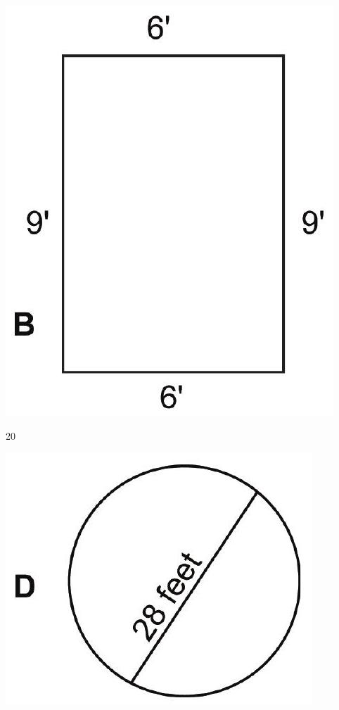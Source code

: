 \documentclass[10pt]{article}
\begin{document}
\includegraphics[max width=\textwidth]{2022_09_11_72dbedc910e6e984560cg-28(1)}

20

\includegraphics[max width=\textwidth]{2022_09_11_72dbedc910e6e984560cg-28(2)}
\end{document}
